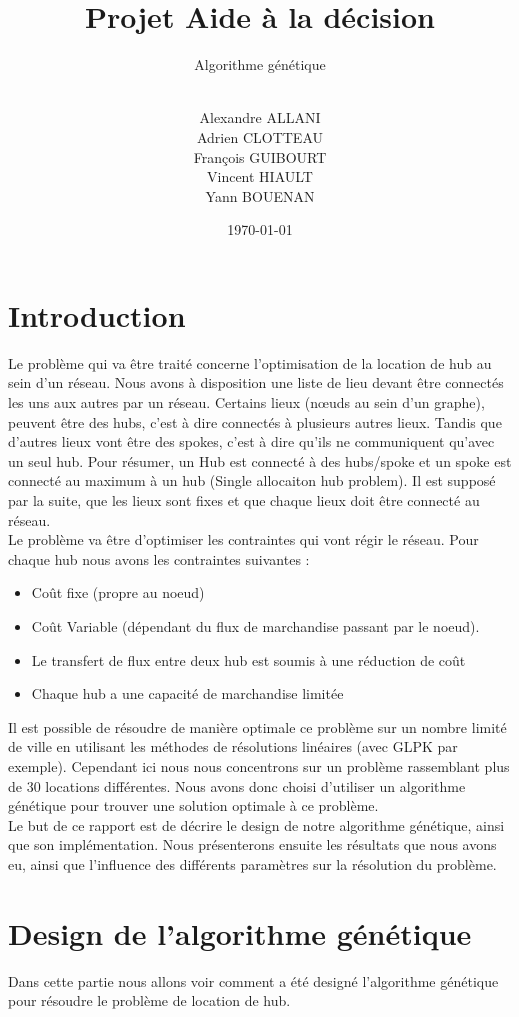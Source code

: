 \documentclass{article} %
\author{\\ Alexandre ALLANI \\
Adrien CLOTTEAU \\
François GUIBOURT \\
Vincent HIAULT \\
Yann BOUENAN}
\date{\noexpand\today} %
\title{Projet Aide à la décision}
\subtitle{Algorithme génétique}
\begin{document}
\imtaMaketitlepage
\tableofcontents
\newpage
\section{Introduction}
Le problème qui va être traité concerne l'optimisation de la location de hub au sein d'un réseau. Nous avons à disposition une liste de lieu devant être connectés les uns aux autres par un réseau. Certains lieux (nœuds au sein d'un graphe), peuvent être des hubs, c'est à dire connectés à plusieurs autres lieux. Tandis que d'autres lieux vont être des spokes, c'est à dire qu'ils ne communiquent qu'avec un seul hub. Pour résumer, un Hub est connecté à des hubs/spoke et un spoke est connecté au maximum à un hub (Single allocaiton hub problem). Il est supposé par la suite, que les lieux sont fixes et que chaque lieux doit être connecté au réseau.\\

Le problème va être d'optimiser les contraintes qui vont régir le réseau. Pour chaque hub nous avons les contraintes suivantes :
\begin{itemize}
	\item Coût fixe (propre au noeud)
	\item Coût Variable (dépendant du flux de marchandise passant par le noeud). 
	\item Le transfert de flux entre deux hub est soumis à une réduction de coût
	\item Chaque hub a une capacité de marchandise limitée
\end{itemize}

Il est possible de résoudre de manière optimale ce problème sur un nombre limité de ville en utilisant les méthodes de résolutions linéaires (avec GLPK par exemple). Cependant ici nous nous concentrons sur un problème rassemblant plus de 30 locations différentes. Nous avons donc choisi d'utiliser un algorithme génétique pour trouver une solution optimale à ce problème.\\


Le but de ce rapport est de décrire le design de notre algorithme génétique, ainsi que son implémentation. Nous présenterons ensuite les résultats que nous avons eu, ainsi que l'influence des différents paramètres sur la résolution du problème.

\newpage
\section{Design de l'algorithme génétique}
Dans cette partie nous allons voir comment a été designé l'algorithme génétique pour résoudre le problème de location de hub.
\end{document}
